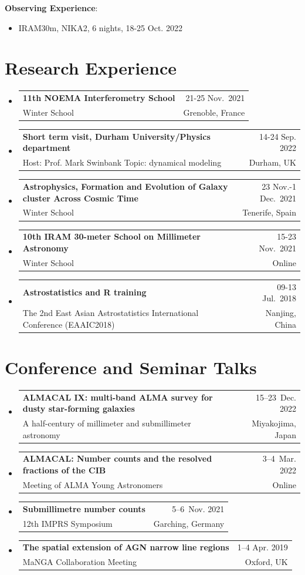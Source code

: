 \documentclass[A4,11pt]{article}
\makeatletter
\newcommand{\CVSubheading}[4]{
  \vspace{-2pt}\item
    \begin{tabular*}{0.97\textwidth}[t]{l@{\extracolsep{\fill}}r}
      \textbf{#1} & #2 \\
      \small#3 & \small #4 \\
    \end{tabular*}\vspace{-7pt}
}
\newcommand{\CVSubHeadingListStart}{\begin{itemize}[leftmargin=0.5cm, label={}]}
\newcommand{\CVSubHeadingListEnd}{\end{itemize}}
\newenvironment{paperlist}
{ \begin{itemize}[leftmargin=0.8cm, label={$\bullet$}]
    \setlength{\itemsep}{1pt}
    \setlength{\parskip}{1pt}
    \setlength{\parsep}{1pt}     }
{ \end{itemize}                  }
\makeatother
\begin{document}
{\bf Observing Experience}:\\
\vspace{-0.8em}
\begin{paperlist}
    \item IRAM30m, NIKA2, 6 nights, 18-25 Oct. 2022
\end{paperlist}

\section{Research Experience}
  \CVSubHeadingListStart
    \CVSubheading
      {11th NOEMA Interferometry School}{21-25 Nov.~2021}
      {Winter School}{Grenoble, France}
    \CVSubheading 
      {Short term visit, Durham University/Physics department}{14-24 Sep. 2022}
      {Host: Prof. Mark Swinbank Topic: dynamical modeling}{Durham, UK}
    \CVSubheading 
      {Astrophysics, Formation and Evolution of Galaxy cluster Across Cosmic Time}{23 Nov.-1 Dec.~2021}
      {Winter School}{Tenerife, Spain}
    \CVSubheading 
      {10th IRAM 30-meter School on Millimeter Astronomy}{15-23 Nov.~2021}
      {Winter School}{Online}
    \CVSubheading
      {Astrostatistics and R training}{09-13 Jul.~2018}
      {The 2nd East Asian Astrostatistics International Conference (EAAIC2018)}{Nanjing, China}
  \CVSubHeadingListEnd


\section{Conference and Seminar Talks}
  \CVSubHeadingListStart
    \CVSubheading
      {ALMACAL IX: multi-band ALMA survey for dusty star-forming galaxies}{15--23~Dec. 2022}
      {A half-century of millimeter and submillimeter astronomy}{Miyakojima, Japan}
    \CVSubheading
      {ALMACAL: Number counts and the resolved fractions of the CIB}{3--4~Mar. 2022}
      {Meeting of ALMA Young Astronomers}{Online}
    \CVSubheading
      {Submillimetre number counts}{5--6~Nov. 2021}
      {12th IMPRS Symposium}{Garching, Germany}
    \CVSubheading
      {The spatial extension of AGN narrow line regions}{1--4 Apr. 2019}
      {MaNGA Collaboration Meeting}{Oxford, UK}
  \CVSubHeadingListEnd
\end{document}
